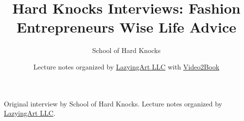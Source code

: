 \documentclass[11pt,oneside]{book}
\begin{document}
\frontmatter
\title{Hard Knocks Interviews: Fashion Entrepreneurs Wise Life Advice}
\author{School of Hard Knocks}
\date{Lecture notes organized by \href{https://lazying.art}{LazyingArt LLC} with \href{https://github.com/lachlanchen/Video2Book}{Video2Book}}
\maketitle
\begin{center}
\small Original interview by School of Hard Knocks. Lecture notes organized by \href{https://lazying.art}{LazyingArt LLC}.
\end{center}
\clearpage
\mainmatter

\end{document}
